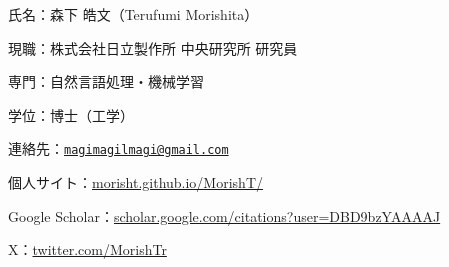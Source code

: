 \begin{cvsmallitemize}
  \item 氏名：森下 皓文（Terufumi Morishita）
  \item 現職：株式会社日立製作所 中央研究所 研究員
  \item 専門：自然言語処理・機械学習
  \item 学位：博士（工学）
  \item 連絡先：\href{mailto:magimagilmagi@gmail.com}{\texttt{magimagilmagi@gmail.com}}
  \item 個人サイト：\href{https://morisht.github.io/MorishT/}{morisht.github.io/MorishT/}
  \item Google Scholar：\href{https://scholar.google.com/citations?user=DBD9bzYAAAAJ}{scholar.google.com/citations?user=DBD9bzYAAAAJ}
  \item X：\href{https://twitter.com/MorishTr}{twitter.com/MorishTr}
\end{cvsmallitemize}
